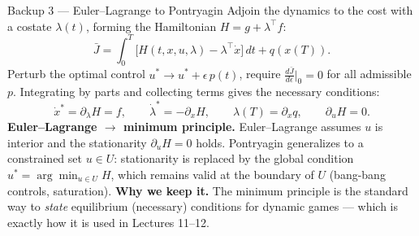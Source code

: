 \documentclass[10pt, aspectratio=169]{beamer}
\begin{document}
\begin{frame}{Backup 3 --- Euler--Lagrange to Pontryagin}
\footnotesize
Adjoin the dynamics to the cost with a costate $\lambda(t)$, forming the Hamiltonian $H = g + \lambda^\top f$:
\[
\bar J = \int_0^T \big[ H(t,x,u,\lambda) - \lambda^\top \dot x \big]\,dt + q(x(T)).
\]
Perturb the optimal control $u^* \to u^* + \epsilon\, p(t)$, require $\tfrac{d\bar J}{d\epsilon}\big|_{0}=0$ for all admissible $p$. Integrating by parts and collecting terms gives the necessary conditions:
\[
\dot x^* = \partial_\lambda H = f, \qquad
\dot\lambda^* = -\partial_x H, \qquad
\lambda(T) = \partial_x q, \qquad
\partial_u H = 0.
\]
\textbf{Euler--Lagrange $\to$ minimum principle.} Euler--Lagrange assumes $u$ is interior and the stationarity $\partial_u H = 0$ holds. Pontryagin generalizes to a constrained set $u\in U$: stationarity is replaced by the global condition $u^* = \arg\min_{u\in U} H$, which remains valid at the boundary of $U$ (bang-bang controls, saturation).
\medskip
\textbf{Why we keep it.} The minimum principle is the standard way to \emph{state} equilibrium (necessary) conditions for dynamic games --- which is exactly how it is used in Lectures 11--12.
\end{frame}
\end{document}
